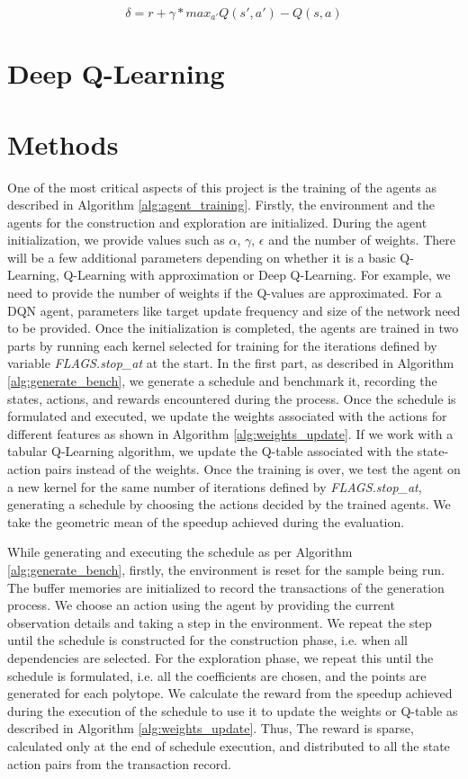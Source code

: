 \documentclass[logo,msc]{infthesis}           %
\begin{document}
\begin{equation}
{\delta} = r + {\gamma} * max_{a'} Q(s',a') - Q(s,a)
\label{eq:delta}
\end{equation}

\section{Deep Q-Learning}

\section{Methods}

One of the most critical aspects of this project is the training of the agents as described in Algorithm \ref{alg:agent_training}. Firstly, the environment and the agents for the construction and exploration are initialized. During the agent initialization, we provide values such as $\alpha$, $\gamma$, $\epsilon$ and the number of weights. There will be a few additional parameters depending on whether it is a basic Q-Learning, Q-Learning with approximation or Deep Q-Learning. For example, we need to provide the number of weights if the Q-values are approximated. For a DQN agent, parameters like target update frequency and size of the network need to be provided. Once the initialization is completed, the agents are trained in two parts by running each kernel selected for training for the iterations defined by variable \textit{FLAGS.stop\_at} at the start. In the first part, as described in Algorithm \ref{alg:generate_bench}, we generate a schedule and benchmark it, recording the states, actions, and rewards encountered during the process. Once the schedule is formulated and executed, we update the weights associated with the actions for different features as shown in Algorithm \ref{alg:weights_update}. If we work with a tabular Q-Learning algorithm, we update the Q-table associated with the state-action pairs instead of the weights. Once the training is over, we test the agent on a new kernel for the same number of iterations defined by \textit{FLAGS.stop\_at}, generating a schedule by choosing the actions decided by the trained agents. We take the geometric mean \cite{10.1145/5666.5673} of the speedup achieved during the evaluation.

While generating and executing the schedule as per Algorithm \ref{alg:generate_bench}, firstly, the environment is reset for the sample being run. The buffer memories are initialized to record the transactions of the generation process. We choose an action using the agent by providing the current observation details and taking a step in the environment. We repeat the step until the schedule is constructed for the construction phase, i.e. when all dependencies are selected. For the exploration phase, we repeat this until the schedule is formulated, i.e. all the coefficients are chosen, and the points are generated for each polytope. We calculate the reward from the speedup achieved during the execution of the schedule to use it to update the weights or Q-table as described in Algorithm \ref{alg:weights_update}. Thus, The reward is sparse, calculated only at the end of schedule execution, and distributed to all the state action pairs from the transaction record. 
\end{document}
